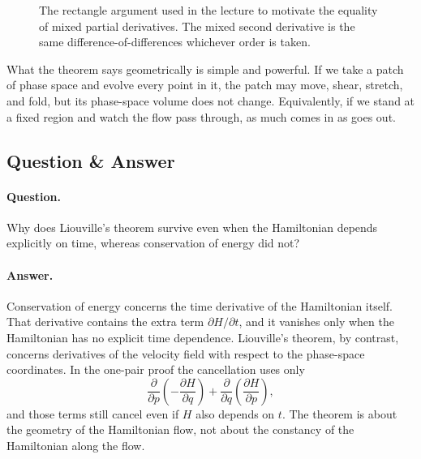 \begin{figure}[h]
\centering
{}
\caption{The rectangle argument used in the lecture to motivate the equality of mixed partial derivatives. The mixed second derivative is the same difference-of-differences whichever order is taken.}
\end{figure}

What the theorem says geometrically is simple and powerful. If we take a patch of phase space and evolve every point in it, the patch may move, shear, stretch, and fold, but its phase-space volume does not change. Equivalently, if we stand at a fixed region and watch the flow pass through, as much comes in as goes out.

\subsection{Question \& Answer}

\paragraph{Question.} Why does Liouville's theorem survive even when the Hamiltonian depends explicitly on time, whereas conservation of energy did not?

\paragraph{Answer.} Conservation of energy concerns the time derivative of the Hamiltonian itself. That derivative contains the extra term \(\partial H/\partial t\), and it vanishes only when the Hamiltonian has no explicit time dependence. Liouville's theorem, by contrast, concerns derivatives of the velocity field with respect to the phase-space coordinates. In the one-pair proof the cancellation uses only
\[
\frac{\partial}{\partial p}\!\left(-\frac{\partial H}{\partial q}\right)
+
\frac{\partial}{\partial q}\!\left(\frac{\partial H}{\partial p}\right),
\]
and those terms still cancel even if \(H\) also depends on \(t\). The theorem is about the geometry of the Hamiltonian flow, not about the constancy of the Hamiltonian along the flow.

